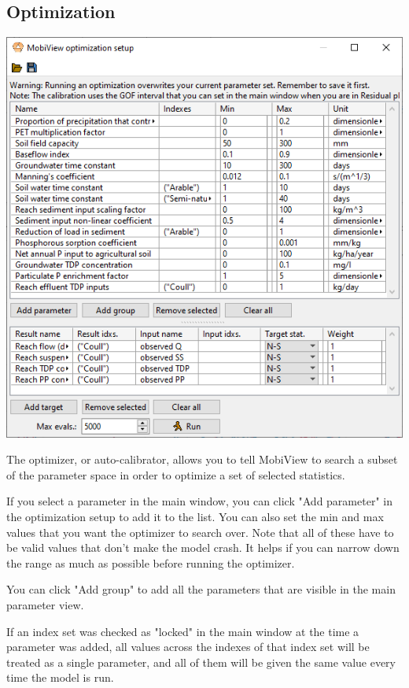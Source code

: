 \documentclass[11pt]{article}
\theoremstyle{definition}
\begin{document}
\subsection{Optimization}

\begin{center}
\includegraphics[width=\linewidth]{img/mobiview_optimizer}
\end{center}

The optimizer, or auto-calibrator, allows you to tell MobiView to search a subset of the parameter space in order to optimize a set of selected statistics.

If you select a parameter in the main window, you can click "Add parameter" in the optimization setup to add it to the list. You can also set the min and max values that you want the optimizer to search over. Note that all of these have to be valid values that don't make the model crash. It helps if you can narrow down the range as much as possible before running the optimizer.

You can click "Add group" to add all the parameters that are visible in the main parameter view.

If an index set was checked as "locked" in the main window at the time a parameter was added, all values across the indexes of that index set will be treated as a single parameter, and all of them will be given the same value every time the model is run.
\end{document}
